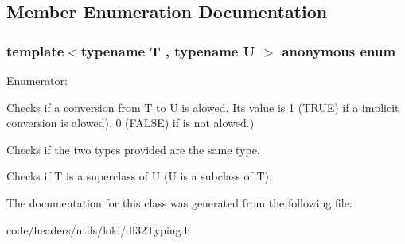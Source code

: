 \subsection{Member Enumeration Documentation}
\hypertarget{classdl32_type_checking_af704e66eb52ac323db77bb4b6641bf23}{\subsubsection[{anonymous enum}]{\setlength{\rightskip}{0pt plus 5cm}template$<$typename T , typename U $>$ anonymous enum}}\label{classdl32_type_checking_af704e66eb52ac323db77bb4b6641bf23}
\begin{Desc}
\item[Enumerator\-: ]\par
\begin{description}
\item[{\em 
\hypertarget{classdl32_type_checking_af704e66eb52ac323db77bb4b6641bf23a87324d6082ae17d85c78bfbe767193a3}{conversion\-\_\-exists}\label{classdl32_type_checking_af704e66eb52ac323db77bb4b6641bf23a87324d6082ae17d85c78bfbe767193a3}
}]Checks if a conversion from T to U is alowed. Its value is 1 (T\-R\-U\-E) if a implicit conversion is alowed). 0 (F\-A\-L\-S\-E) if is not alowed.) \item[{\em 
\hypertarget{classdl32_type_checking_af704e66eb52ac323db77bb4b6641bf23af85164cb8544485dbc44c84c2b211f59}{same\-\_\-type}\label{classdl32_type_checking_af704e66eb52ac323db77bb4b6641bf23af85164cb8544485dbc44c84c2b211f59}
}]Checks if the two types provided are the same type. \item[{\em 
\hypertarget{classdl32_type_checking_af704e66eb52ac323db77bb4b6641bf23aae27a8c3b30cec53193637ca0ca5c554}{superclass\-\_\-subclass}\label{classdl32_type_checking_af704e66eb52ac323db77bb4b6641bf23aae27a8c3b30cec53193637ca0ca5c554}
}]Checks if T is a superclass of U (U is a subclass of T). \end{description}
\end{Desc}



The documentation for this class was generated from the following file\-:\begin{DoxyCompactItemize}
\item 
code/headers/utils/loki/dl32\-Typing.\-h\end{DoxyCompactItemize}
